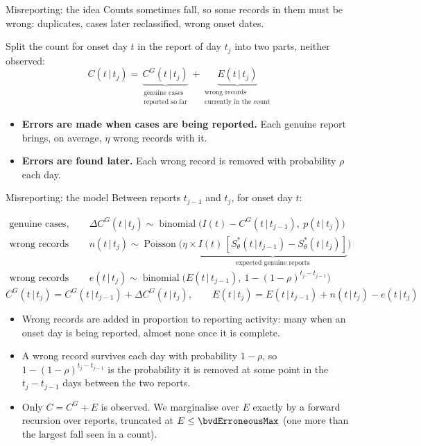 \documentclass[aspectratio=169,9pt]{beamer}
\newcommand{\given}{\,|\,}
\begin{document}
\begin{frame}{Misreporting: the idea}
Counts sometimes fall, so some records in them must be wrong: duplicates,
cases later reclassified, wrong onset dates.

\bigskip
Split the count for onset day $t$ in the report of day $t_j$ into two parts,
neither observed:
\[
C(t\given t_j)=\underbrace{C^{G}(t\given t_j)}_{\substack{\text{genuine cases}\\\text{reported so far}}}
+\underbrace{E(t\given t_j)}_{\substack{\text{wrong records}\\\text{currently in the count}}}
\]

\medskip
\begin{itemize}
\item \textbf{Errors are made when cases are being reported.} Each genuine
report brings, on average, $\eta$ wrong records with it.
\item \textbf{Errors are found later.} Each wrong record is removed with
probability $\rho$ each day.
\end{itemize}
\end{frame}

\begin{frame}{Misreporting: the model}
Between reports $t_{j-1}$ and $t_j$, for onset day $t$:

\medskip
\begin{align*}
\text{genuine cases, newly reported}\quad & \Delta C^{G}(t\given t_j)\sim\operatorname{binomial}\bigl(I(t)-C^{G}(t\given t_{j-1}),\ p(t\given t_j)\bigr)\\[3pt]
\text{wrong records added}\quad & n(t\given t_j)\sim\operatorname{Poisson}\bigl(\eta\times
\underbrace{I(t)\,[S^{*}_\theta(t\given t_{j-1})-S^{*}_\theta(t\given t_j)]}_{\text{expected genuine reports}}\bigr)\\[3pt]
\text{wrong records removed}\quad & e(t\given t_j)\sim\operatorname{binomial}\bigl(E(t\given t_{j-1}),\ 1-(1-\rho)^{t_j-t_{j-1}}\bigr)
\end{align*}
\[
C^{G}(t\given t_j)=C^{G}(t\given t_{j-1})+\Delta C^{G}(t\given t_j),\qquad E(t\given t_j)=E(t\given t_{j-1})+n(t\given t_j)-e(t\given t_j)
\]

\smallskip
\small
\begin{itemize}
\item Wrong records are added in proportion to reporting activity: many when
an onset day is being reported, almost none once it is complete.
\item A wrong record survives each day with probability $1-\rho$, so
$1-(1-\rho)^{t_j-t_{j-1}}$ is the probability it is removed at some point in
the $t_j-t_{j-1}$ days between the two reports.
\item Only $C=C^{G}+E$ is observed. We marginalise over $E$ exactly by a forward
recursion over reports, truncated at $E\le\bvdErroneousMax$ (one more than
the largest fall seen in a count).
\end{itemize}
\end{frame}
\end{document}
